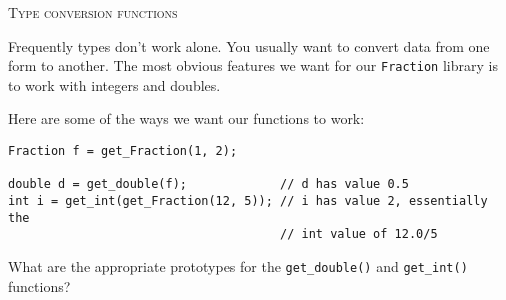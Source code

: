\textsc{Type conversion functions}

Frequently types don't work alone. You usually want to convert data from one
form to another. The most obvious features we want for our \verb!Fraction!
library is to work with integers and doubles.

Here are some of the ways we want our functions to work:
\begin{Verbatim}[frame=single]
Fraction f = get_Fraction(1, 2);

double d = get_double(f);             // d has value 0.5
int i = get_int(get_Fraction(12, 5)); // i has value 2, essentially the 
                                      // int value of 12.0/5
\end{Verbatim}

What are the appropriate prototypes for the \verb!get_double()! and
\verb!get_int()! functions?

